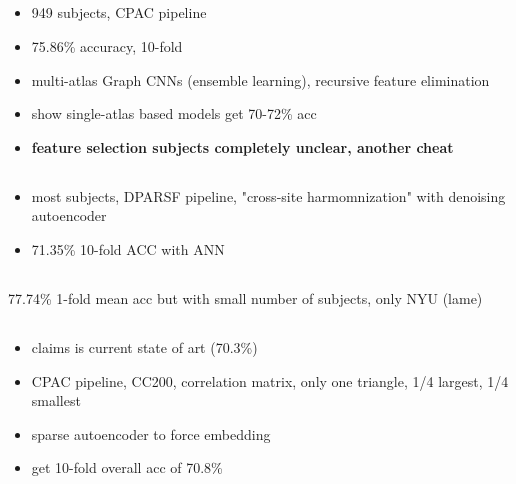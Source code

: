 \documentclass[10pt]{article}
\begin{document}
\subsection{\citet{wangMAGEAutomaticDiagnosis2021}}

\begin{itemize}
  \item 949 subjects, CPAC pipeline
  \item 75.86\% accuracy, 10-fold
  \item multi-atlas Graph CNNs (ensemble learning), recursive feature elimination
  \item show single-atlas based models get 70-72\% acc
  \item \textbf{feature selection subjects completely unclear, another cheat}
\end{itemize}

\subsection{\citet{ingalhalikarFunctionalConnectivitybasedPrediction2021}}

\begin{itemize}
  \item most subjects, DPARSF pipeline, "cross-site harmomnization" with denoising autoencoder
  \item 71.35\% 10-fold ACC with ANN
\end{itemize}

\subsection{\citet{yangLargeScaleBrainFunctional2021}}

77.74\% 1-fold mean acc but with small number of subjects, only NYU (lame)

\subsection{\citet{almuqhimASDSAENetSparseAutoencoder2021}}

\begin{itemize}
  \item claims \citet{eslamiASDDiagNetHybridLearning2019} is current state of art (70.3\%)
  \item CPAC pipeline, CC200, correlation matrix, only one triangle, 1/4 largest, 1/4 smallest
  \item sparse autoencoder to force embedding
  \item get 10-fold overall acc of 70.8\%
\end{itemize}
\end{document}
